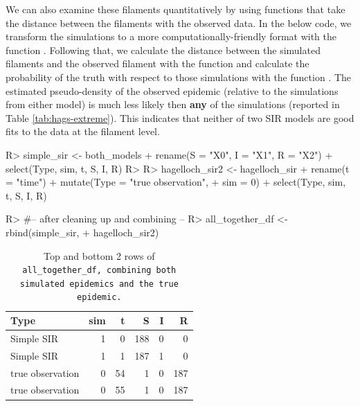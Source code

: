 \documentclass[
  shortnames]{jss}
\begin{document}
We can also examine these filaments quantitatively by using functions
that take the distance between the filaments with the observed data. In
the below code, we transform the simulations to a more
computationally-friendly format with the function
. Following that, we calculate the distance
between the simulated filaments and the observed filament with the
function  and calculate the
probability of the truth with respect to those simulations with the
function . The estimated
pseudo-density of the observed epidemic (relative to the simulations
from either model) is much less likely then \textbf{any} of the
simulations (reported in Table \ref{tab:hags-extreme}). This indicates
that neither of two SIR models are good fits to the data at the filament
level.

\begin{CodeChunk}
\begin{CodeInput}
R> simple_sir <- both_models %
+   rename(S = "X0", I = "X1", R = "X2") %
+   select(Type, sim, t, S, I, R)
R> 
R> hagelloch_sir2 <- hagelloch_sir %
+   rename(t = "time") %
+   mutate(Type = "true observation",
+          sim = 0) %
+   select(Type, sim, t, S, I, R)
\end{CodeInput}
\end{CodeChunk}

\begin{CodeChunk}
\begin{CodeInput}
R> #-- after cleaning up and combining --
R> all_together_df <- rbind(simple_sir,
+                          hagelloch_sir2)
\end{CodeInput}
\end{CodeChunk}

\begin{CodeChunk}
\begin{table}[!h]

\caption{\label{tab:cif-all-together-df}Top and bottom 2 rows of \tt{all\_together\_df}\textnormal{, combining both simulated epidemics and the true epidemic.}}
\centering
\begin{tabular}[t]{lrrrrr}
\toprule
Type & sim & t & S & I & R\\
\midrule
Simple SIR & 1 & 0 & 188 & 0 & 0\\
Simple SIR & 1 & 1 & 187 & 1 & 0\\
true observation & 0 & 54 & 1 & 0 & 187\\
true observation & 0 & 55 & 1 & 0 & 187\\
\bottomrule
\end{tabular}
\end{table}

\end{CodeChunk}
\end{document}
